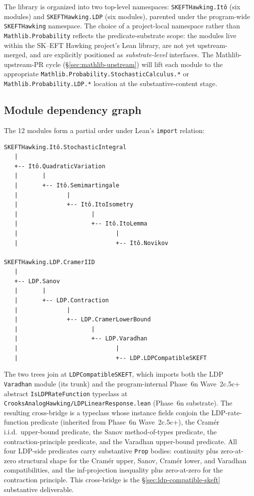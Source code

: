 \documentclass[11pt]{article}
\begin{document}
The library is organized into two top-level namespaces:
\texttt{SKEFTHawking.It\^o} (six modules) and
\texttt{SKEFTHawking.LDP} (six modules), parented under the
program-wide \texttt{SKEFTHawking} namespace. The choice of a
project-local namespace rather than \texttt{Mathlib.Probability}
reflects the predicate-substrate scope: the modules live within
the SK--EFT Hawking project's Lean library, are not yet
upstream-merged, and are explicitly positioned as
\emph{substrate-level} interfaces. The Mathlib-upstream-PR cycle
(\S\ref{sec:mathlib-upstream}) will lift each module to the
appropriate \texttt{Mathlib.Probability.StochasticCalculus.*} or
\texttt{Mathlib.Probability.LDP.*} location at the
substantive-content stage.

\subsection{Module dependency graph}

The 12 modules form a partial order under Lean's \texttt{import}
relation:

\begin{lstlisting}
SKEFTHawking.Itô.StochasticIntegral
   |
   +-- Itô.QuadraticVariation
   |       |
   |       +-- Itô.Semimartingale
   |              |
   |              +-- Itô.ItoIsometry
   |                     |
   |                     +-- Itô.ItoLemma
   |                            |
   |                            +-- Itô.Novikov

SKEFTHawking.LDP.CramerIID
   |
   +-- LDP.Sanov
   |       |
   |       +-- LDP.Contraction
   |              |
   |              +-- LDP.CramerLowerBound
   |                     |
   |                     +-- LDP.Varadhan
   |                            |
   |                            +-- LDP.LDPCompatibleSKEFT
\end{lstlisting}

The two trees join at \texttt{LDPCompatibleSKEFT}, which imports
both the LDP \texttt{Varadhan} module (its trunk) and the
program-internal Phase~6n Wave~2c.5c+ abstract
\texttt{IsLDPRateFunction} typeclass at
\texttt{CrooksAnalogHawking/LDPLinearResponse.lean} (Phase~6n
substrate). The resulting cross-bridge is a typeclass whose
instance fields conjoin the LDP-rate-function predicate
(inherited from Phase~6n Wave~2c.5c+), the
Cram\'er i.i.d.\ upper-bound predicate, the Sanov method-of-types
predicate, the contraction-principle predicate, and the Varadhan
upper-bound predicate. All four LDP-side predicates carry substantive
\texttt{Prop} bodies: continuity plus zero-at-zero structural shape
for the Cram\'er upper, Sanov, Cram\'er lower, and Varadhan
compatibilities, and the inf-projection inequality plus zero-at-zero for
the contraction principle. This cross-bridge is the
\S\ref{sec:ldp-compatible-skeft} substantive deliverable.
\end{document}
